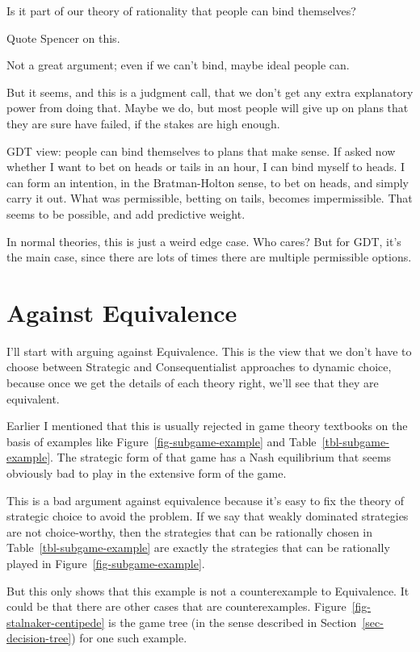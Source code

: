 \documentclass[
  12pt,
  letterpaper,
  DIV=11,
  numbers=noendperiod]{scrreprt}
\begin{document}
Is it part of our theory of rationality that people can bind themselves?

Quote Spencer on this.

Not a great argument; even if we can't bind, maybe ideal people can.

But it seems, and this is a judgment call, that we don't get any extra
explanatory power from doing that. Maybe we do, but most people will
give up on plans that they are sure have failed, if the stakes are high
enough.

GDT view: people can bind themselves to plans that make sense. If asked
now whether I want to bet on heads or tails in an hour, I can bind
myself to heads. I can form an intention, in the Bratman-Holton sense,
to bet on heads, and simply carry it out. What was permissible, betting
on tails, becomes impermissible. That seems to be possible, and add
predictive weight.

In normal theories, this is just a weird edge case. Who cares? But for
GDT, it's the main case, since there are lots of times there are
multiple permissible options.

\hypertarget{sec-against-equivalence}{%
\section{Against Equivalence}\label{sec-against-equivalence}}

I'll start with arguing against Equivalence. This is the view that we
don't have to choose between Strategic and Consequentialist approaches
to dynamic choice, because once we get the details of each theory right,
we'll see that they are equivalent.

Earlier I mentioned that this is usually rejected in game theory
textbooks on the basis of examples like Figure~\ref{fig-subgame-example}
and Table~\ref{tbl-subgame-example}. The strategic form of that game has
a Nash equilibrium that seems obviously bad to play in the extensive
form of the game.

This is a bad argument against equivalence because it's easy to fix the
theory of strategic choice to avoid the problem. If we say that weakly
dominated strategies are not choice-worthy, then the strategies that can
be rationally chosen in Table~\ref{tbl-subgame-example} are exactly the
strategies that can be rationally played in
Figure~\ref{fig-subgame-example}.

But this only shows that this example is not a counterexample to
Equivalence. It could be that there are other cases that are
counterexamples. Figure~\ref{fig-stalnaker-centipede} is the game tree
(in the sense described in Section~\ref{sec-decision-tree}) for one such
example.
\end{document}
